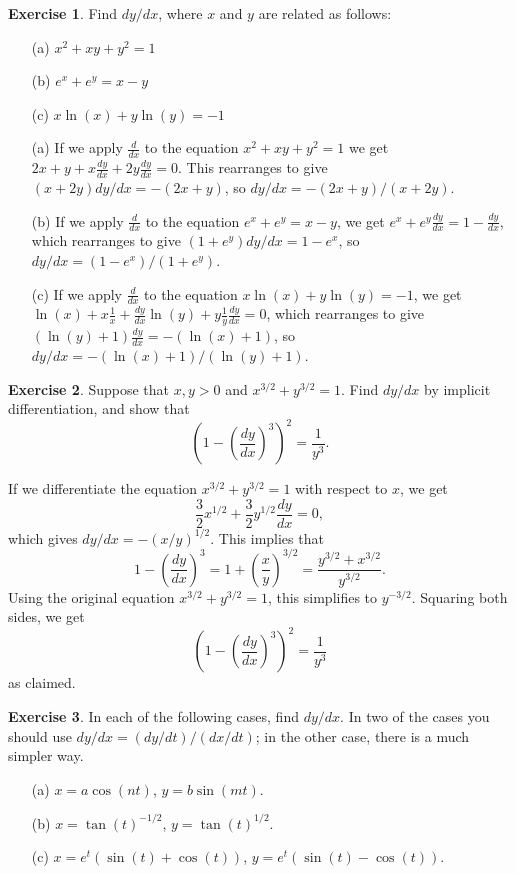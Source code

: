 \documentclass[a4paper]{amsart}
\theoremstyle{definition}
\newtheorem{exercise}{Exercise}[section]
\newenvironment{solution}{{\noindent \bf Solution:}}{}
\begin{document}
\begin{exercise}\label{ex-impmisc}
Find $dy/dx$, where $x$ and $y$ are related as follows:
 \begin{itemize}
  \item[(a)] $x^2+xy+y^2=1$
  \item[(b)] $e^x+e^y=x-y$
  \item[(c)] $x\ln(x)+y\ln(y)=-1$
 \end{itemize}
\end{exercise}
\begin{solution}
 \begin{itemize}
  \item[(a)] If we apply $\frac{d}{dx}$ to the equation $x^2+xy+y^2=1$ 
   we get $2x+y+x\frac{dy}{dx}+2y\frac{dy}{dx}=0$.  This rearranges to
   give $(x+2y)dy/dx=-(2x+y)$, so $dy/dx=-(2x+y)/(x+2y)$.
  \item[(b)] If we apply $\frac{d}{dx}$ to the equation
   $e^x+e^y=x-y$, we get
   $e^x+e^y\frac{dy}{dx}=1-\frac{dy}{dx}$,
   which rearranges to give 
   $(1+e^y)dy/dx=1-e^x$,
   so
   $dy/dx=(1-e^x)/(1+e^y)$.
  \item[(c)] If we apply $\frac{d}{dx}$ to the equation
   $x\ln(x)+y\ln(y)=-1$, we get
   $\ln(x)+x\frac{1}{x}+\frac{dy}{dx}\ln(y)+y\frac{1}{y}\frac{dy}{dx}=0$,
   which rearranges to give 
   $(\ln(y)+1)\frac{dy}{dx}=-(\ln(x)+1)$,
   so
   $dy/dx=-(\ln(x)+1)/(\ln(y)+1)$. 
 \end{itemize}
\end{solution}
\begin{exercise}\label{ex-threehalves}
Suppose that $x,y>0$ and $x^{3/2}+y^{3/2}=1$.  Find $dy/dx$
 by implicit differentiation, and show that 
 \[ \left(1 - \left(\frac{dy}{dx}\right)^3\right)^2 = 
     \frac{1}{y^3}.
 \]
\end{exercise}
\begin{solution}
 If we differentiate the equation $x^{3/2}+y^{3/2}=1$ with 
 respect to $x$, we get
 \[ \frac{3}{2}x^{1/2} + \frac{3}{2}y^{1/2}\frac{dy}{dx} = 0, \]
 which gives $dy/dx=-(x/y)^{1/2}$.  This implies that
 \[ 1-\left(\frac{dy}{dx}\right)^3 =
    1+\left(\frac{x}{y}\right)^{3/2} = 
    \frac{y^{3/2}+x^{3/2}}{y^{3/2}}.
 \]
 Using the original equation $x^{3/2}+y^{3/2}=1$, this
 simplifies to $y^{-3/2}$.  Squaring both sides, we get
 \[ \left(1 - \left(\frac{dy}{dx}\right)^3\right)^2 = 
     \frac{1}{y^3}
 \]
 as claimed.
\end{solution}
\begin{exercise}\label{ex-parmisc}
In each of the following cases, find $dy/dx$.  In two of
 the cases you should use $dy/dx=(dy/dt)/(dx/dt)$; in the
 other case, there is a much simpler way.
 \begin{itemize}
  \item[(a)] $x=a\cos(nt)$, $y=b\sin(mt)$.
  \item[(b)] $x=\tan(t)^{-1/2}$, $y=\tan(t)^{1/2}$.
  \item[(c)] $x=e^t(\sin(t)+\cos(t))$,
   $y=e^t(\sin(t)-\cos(t))$. 
 \end{itemize}
\end{exercise}
\end{document}
